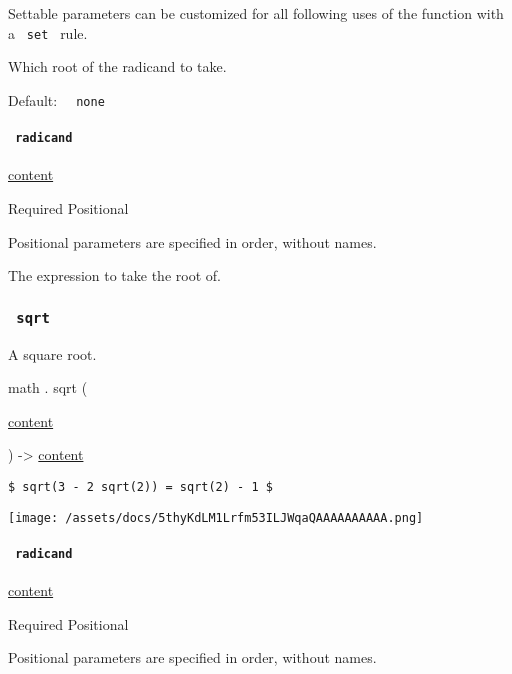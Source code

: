 \label{functions-root-index-settable-tooltip}
Settable parameters can be customized for all following uses of the
function with a \texttt{\ set\ } rule.

Which root of the radicand to take.

Default: \texttt{\ }{\texttt{\ none\ }}\texttt{\ }

\paragraph{\texorpdfstring{\texttt{\ radicand\ }}{ radicand }}\label{functions-root-radicand}

\href{/docs/reference/foundations/content/}{content}

{Required} {{ Positional }}

\label{functions-root-radicand-positional-tooltip}
Positional parameters are specified in order, without names.

The expression to take the root of.

\subsubsection{\texorpdfstring{\texttt{\ sqrt\ }}{ sqrt }}\label{functions-sqrt}

A square root.

math { . } { sqrt } (

{ \href{/docs/reference/foundations/content/}{content} }

) -\textgreater{} \href{/docs/reference/foundations/content/}{content}

\begin{verbatim}
$ sqrt(3 - 2 sqrt(2)) = sqrt(2) - 1 $
\end{verbatim}

\texttt{[image: /assets/docs/5thyKdLM1Lrfm53ILJWqaQAAAAAAAAAA.png]}

\paragraph{\texorpdfstring{\texttt{\ radicand\ }}{ radicand }}\label{functions-sqrt-radicand}

\href{/docs/reference/foundations/content/}{content}

{Required} {{ Positional }}

\label{functions-sqrt-radicand-positional-tooltip}
Positional parameters are specified in order, without names.

